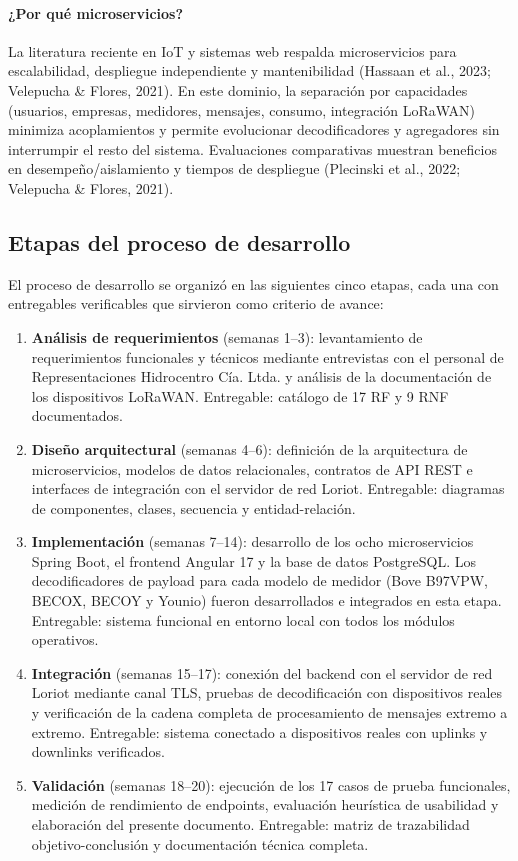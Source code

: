 \documentclass[12pt,a4paper,oneside]{report}
\begin{document}
\paragraph{¿Por qué microservicios?} La literatura reciente en IoT y sistemas web respalda microservicios para escalabilidad, despliegue independiente y mantenibilidad (Hassaan et al., 2023; Velepucha \& Flores, 2021). En este dominio, la separación por capacidades (usuarios, empresas, medidores, mensajes, consumo, integración LoRaWAN) minimiza acoplamientos y permite evolucionar decodificadores y agregadores sin interrumpir el resto del sistema. Evaluaciones comparativas muestran beneficios en desempeño/aislamiento y tiempos de despliegue (Plecinski et al., 2022; Velepucha \& Flores, 2021).

\subsection{Etapas del proceso de desarrollo}\label{subsec:etapas-desarrollo}

El proceso de desarrollo se organizó en las siguientes cinco etapas, cada una con entregables verificables que sirvieron como criterio de avance:

\begin{enumerate}
  \item \textbf{Análisis de requerimientos} (semanas 1--3): levantamiento de requerimientos funcionales y técnicos mediante entrevistas con el personal de Representaciones Hidrocentro Cía. Ltda. y análisis de la documentación de los dispositivos LoRaWAN. Entregable: catálogo de 17 RF y 9 RNF documentados.
  \item \textbf{Diseño arquitectural} (semanas 4--6): definición de la arquitectura de microservicios, modelos de datos relacionales, contratos de API REST e interfaces de integración con el servidor de red Loriot. Entregable: diagramas de componentes, clases, secuencia y entidad-relación.
  \item \textbf{Implementación} (semanas 7--14): desarrollo de los ocho microservicios Spring Boot, el frontend Angular 17 y la base de datos PostgreSQL. Los decodificadores de payload para cada modelo de medidor (Bove B97VPW, BECOX, BECOY y Younio) fueron desarrollados e integrados en esta etapa. Entregable: sistema funcional en entorno local con todos los módulos operativos.
  \item \textbf{Integración} (semanas 15--17): conexión del backend con el servidor de red Loriot mediante canal TLS, pruebas de decodificación con dispositivos reales y verificación de la cadena completa de procesamiento de mensajes extremo a extremo. Entregable: sistema conectado a dispositivos reales con uplinks y downlinks verificados.
  \item \textbf{Validación} (semanas 18--20): ejecución de los 17 casos de prueba funcionales, medición de rendimiento de endpoints, evaluación heurística de usabilidad y elaboración del presente documento. Entregable: matriz de trazabilidad objetivo-conclusión y documentación técnica completa.
\end{enumerate}
\end{document}

